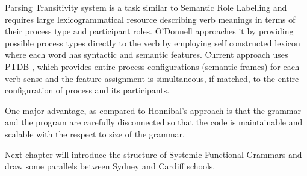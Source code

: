 Parsing Transitivity system is a task similar to Semantic Role Labelling and requires large lexicogrammatical resource describing verb meanings in terms of their process type and participant roles. O'Donnell approaches it by providing possible process types directly to the verb by employing self constructed lexicon where each word has syntactic and semantic features. Current approach uses PTDB \citep{Neale2002}, which provides entire process configurations (semantic frames) for each verb sense and the feature assignment is simultaneous, if matched, to the entire configuration of process and its participants.

One major advantage, as compared to Honnibal's approach is that the grammar and the program are carefully disconnected so that the code is maintainable and scalable with the respect to size of the grammar. 


Next chapter will introduce the structure of Systemic Functional Grammars and draw some parallels between Sydney and Cardiff schools. 

 
